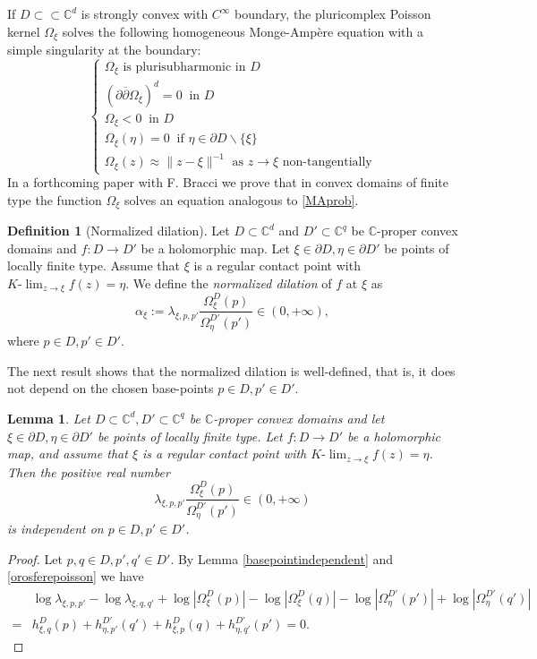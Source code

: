 \documentclass[11pt, reqno]{amsart}
\numberwithin{equation}{section}
\newtheorem{lemma}[theorem]{Lemma}
\theoremstyle{definition}
\newtheorem{definition}[theorem]{Definition}
\newcommand{\C}{\mathbb{C}}
\begin{document}
{{{		If $D\subset\subset \C^d$  is strongly convex with $C^\infty$ boundary, the pluricomplex Poisson kernel $\Omega_\xi$ solves the following homogeneous Monge-Amp\`ere equation with a simple singularity at the boundary:
		\begin{equation}\label{MAprob}\begin{cases*}
				\Omega_\xi\mbox{ is plurisubharmonic in }D\\
				(\partial\overline{\partial}\Omega_\xi)^d=0\ \mbox{ in }D\\
				\Omega_\xi<0 \ \mbox{ in }D\\
				\Omega_\xi(\eta)=0 \ \mbox{ if }\eta\in\partial D\backslash\{\xi\}\\
				\Omega_\xi(z)\approx\|z-\xi\|^{-1} \mbox{ as }z\to\xi\mbox{ non-tangentially}
			\end{cases*}
		\end{equation}
		In a forthcoming paper \cite{toappear}  with F. Bracci  we prove that  in  convex domains of finite type the function $\Omega_\xi$ solves an equation analogous to \eqref{MAprob}.
		\begin{definition}[Normalized dilation]
			Let $D\subset\C^d$ and $D'\subset\C^{q}$ be  $\C$-proper convex domains and $f\colon D\to D'$ be a holomorphic map. 
			Let $\xi\in\partial D,\eta\in \partial D'$ be points of locally finite type.
			Assume that $\xi$ is a regular contact point with $K\textrm{-}\lim_{z\to\xi}f(z)=\eta$. We define the {\sl  normalized dilation} of $f$ at $\xi$ as
			$$\alpha_\xi:=\lambda_{\xi,p,p'}\frac{\Omega^D_\xi(p)}{\Omega^{D'}_\eta(p')}\in (0,+\infty),$$
			where $p\in D,p'\in D'$.
		\end{definition}
		The next result shows that the normalized dilation is well-defined, that is, it does not depend on the chosen base-points $p\in D,p'\in D'.$
		\begin{lemma}
			Let $D\subset\C^d, D'\subset \C^{q}$ be  $\C$-proper convex domains and let $\xi\in\partial D,\eta\in \partial D'$ be   points of locally finite type. 
			Let $f\colon D\to D'$ be a  holomorphic map, and assume that $\xi$ is a regular contact point  with $K\textrm{-}\lim_{z\to\xi}f(z)=\eta$.
			Then the positive real number  $$\lambda_{\xi,p,p'}\frac{\Omega^D_\xi(p)}{\Omega^{D'}_\eta(p')}\in (0,+\infty)$$ is independent on $p\in D,p'\in D'$.
		\end{lemma}
		\begin{proof}
			Let  $p,q\in D,p',q'\in D'$. By Lemma \ref{basepointindependent} and  \eqref{orosferepoisson} we have
			\begin{align*}&\log \lambda_{\xi,p,p'} - \log \lambda_{\xi,q,q'}+\log |\Omega^D_\xi(p)|-\log |\Omega^D_\xi(q)|-\log |\Omega^{D'}_\eta(p')|+\log |\Omega^{D'}_\eta(q')|\\
				=& h^D_{\xi,q}(p)+h^{D'}_{\eta,p'}(q')+ h^D_{\xi, p}(q)+h^{D'}_{\eta,q'}(p')=0.
			\end{align*}
		\end{proof}
		
}}}
\end{document}
